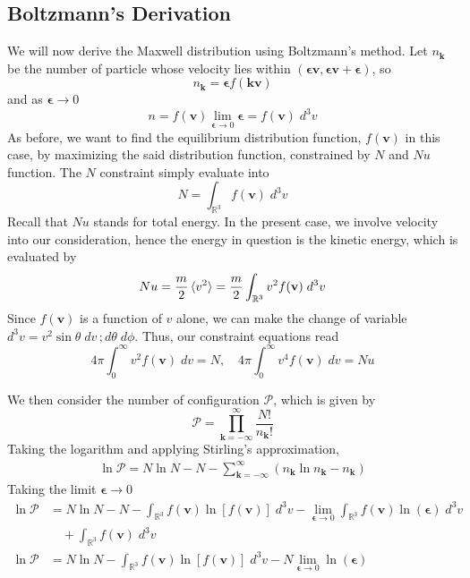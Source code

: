 \documentclass[../../../Main.tex]{subfiles}
\begin{document}
\subsection*{Boltzmann's Derivation}
We will now derive the Maxwell distribution using Boltzmann's method. Let $n_\mathbf{k}$ be the number of particle whose velocity lies within $(\boldsymbol{\epsilon}\mathbf{v},\boldsymbol{\epsilon}\mathbf{v}+\boldsymbol{\epsilon})$, so
\begin{equation*}
    n_\mathbf{k}=\boldsymbol{\epsilon}f(\mathbf{kv})
\end{equation*}
and as $\boldsymbol{\epsilon}\rightarrow0$
\begin{equation*}
    n=f(\mathbf{v})\lim_{\boldsymbol{\epsilon}\rightarrow0}\boldsymbol{\epsilon}=f(\mathbf{v})\;d^3v
\end{equation*}
As before, we want to find the equilibrium distribution function, $f(\mathbf{ v})$ in this case, by maximizing the said distribution function, constrained by $N$ and $Nu$ function. The $N$ constraint simply evaluate into 
\begin{equation*}
    N=\int_{\mathbb{R}^3}  f(\mathbf{v})\;d^3v
\end{equation*}
Recall that $Nu$ stands for total energy. In the present case, we involve velocity into our consideration, hence the energy in question is the kinetic energy, which is evaluated by
\begin{equation*}
    Nu=\frac{m}{2}\braket{v^2}=\frac{m}{2}\int_{\mathbb{R}^3} v^2f(\mathbf{v})\;d^3v
\end{equation*} 
Since $f(\mathbf{v})$ is a function of $v$ alone, we can make the change of variable $d^3v=v^2\sin\theta\;dv\,; d\theta\; d\phi$. Thus, our constraint equations read
\begin{equation*}
    4\pi\int_{0}^{\infty}v^2f(\mathbf{v})\;dv=N, \quad 4\pi \int_{0}^{\infty}v^4f(\mathbf{v})\;dv=Nu
\end{equation*}

We then consider the number of configuration $\mathcal{P}$, which is given by 
\begin{equation*}
    \mathcal{P}=\prod_{\mathbf{k}=-\infty}^{\infty}\frac{N!}{n_\mathbf{k}!}
\end{equation*}
Taking the logarithm and applying Stirling's approximation,
\begin{align*}
    \ln \mathcal{P}=N\ln N-N-\sum_{\mathbf{k=-\infty}}^{\infty}\left(n_\mathbf{k}\ln n_\mathbf{k}-n_\mathbf{k} \right)
\end{align*}
Taking the limit $\boldsymbol{\epsilon}\rightarrow0$
\begin{align*}
    \ln \mathcal{P}&=N\ln N-N - \int_{\mathbb{R}^3}f(\mathbf{v})\ln [f(\mathbf{v})]\;d^3v - \lim_{\boldsymbol{\epsilon}\rightarrow0} \int_{\mathbb{R}^3}f(\mathbf{v})\ln (\boldsymbol{\epsilon})\;d^3v\\
    &\quad+\int_{\mathbb{R}^3}f(\mathbf{v})\;d^3v\\
    \ln \mathcal{P}&=N\ln N - \int_{\mathbb{R}^3}f(\mathbf{v})\ln [f(\mathbf{v})]\;d^3v -N\lim_{\boldsymbol{\epsilon}\rightarrow0}\ln (\boldsymbol{\epsilon})
\end{align*}
\end{document}
